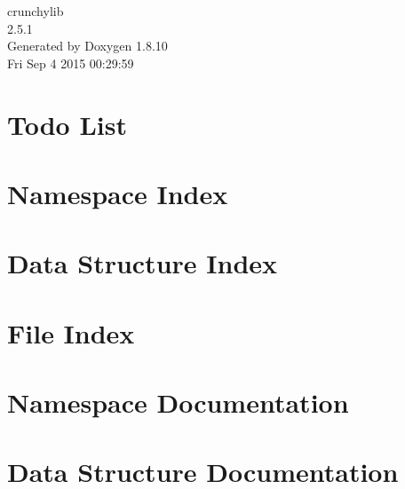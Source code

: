 \documentclass[twoside]{book}
\newcommand{\+}{\discretionary{\mbox{\scriptsize$\hookleftarrow$}}{}{}}
\newcommand{\clearemptydoublepage}{%
  \newpage{\pagestyle{empty}\cleardoublepage}%
}
\begin{document}
\hypersetup{pageanchor=false,
             bookmarks=true,
             bookmarksnumbered=true,
             pdfencoding=unicode
            }
\begin{titlepage}
\vspace*{7cm}
\begin{center}%
{\Large crunchylib \\[1ex]\large 2.\+5.\+1 }\\
\vspace*{1cm}
{\large Generated by Doxygen 1.8.10}\\
\vspace*{0.5cm}
{\small Fri Sep 4 2015 00:29:59}\\
\end{center}
\end{titlepage}
\clearemptydoublepage
\tableofcontents
\clearemptydoublepage
{}
\hypersetup{pageanchor=true}

\chapter{Todo List}
\label{todo}
\hypertarget{todo}{}

\chapter{Namespace Index}

\chapter{Data Structure Index}

\chapter{File Index}

\chapter{Namespace Documentation}







\chapter{Data Structure Documentation}


















\end{document}
